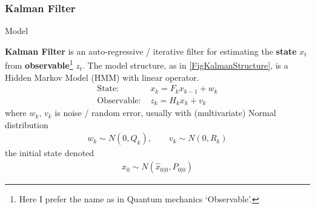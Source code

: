 








\subsubsection{Kalman Filter}
\begin{point}
    Model
\end{point}

    \textbf{Kalman Filter} is an auto-regressive / iterative filter for estimating the \textbf{state} $ x_t $ from \textbf{observable}\footnote{Here I prefer the name as in Quantum mechanics `Observable'.} $ z_t $. The model structure, as in \autoref{FigKalmanStructure}, is a Hidden Markov Model (HMM) with linear operator.
    \begin{align}
        \text{State: }&x_{k}=F_{k}x_{k-1}+w_{k} \\
        \text{Observable: }&z_{k}=H_kx_k+v_k
    \end{align}  
    where $ w_k,\,v_k $ is noise / random error, usually with (multivariate) Normal distribution
    \begin{align}
        w_k\sim N(0,Q_k),\qquad v_k\sim N(0,R_k) 
    \end{align}
    the initial state denoted
    \begin{align}
        x_0\sim N(\hat{x}_{0|0}, P _{0|0}) 
    \end{align}

